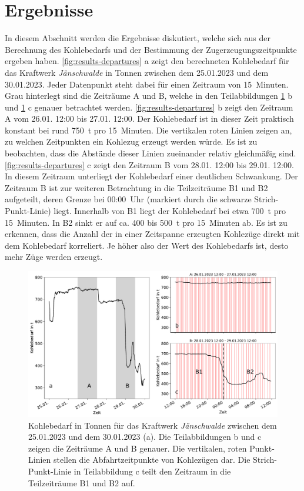 \section{Ergebnisse}

In diesem Abschnitt werden die Ergebnisse diskutiert, welche sich aus der Berechnung des Kohlebedarfs und der Bestimmung der Zugerzeugungszeitpunkte ergeben haben. \autoref{fig:results-departures} a zeigt den berechneten Kohlebedarf für das Kraftwerk \emph{Jänschwalde} in Tonnen zwischen dem 25.01.2023 und dem 30.01.2023. Jeder Datenpunkt steht dabei für einen Zeitraum von 15~Minuten. Grau hinterlegt sind die Zeiträume A und B, welche in den Teilabbildungen \ref{fig:results-departures} b und \ref{fig:results-departures} c genauer betrachtet werden. \autoref{fig:results-departures} b zeigt den Zeitraum A vom 26.01. 12:00 bis 27.01. 12:00. Der Kohlebedarf ist in dieser Zeit praktisch konstant bei rund 750~t pro 15~Minuten. Die vertikalen roten Linien zeigen an, zu welchen Zeitpunkten ein Kohlezug erzeugt werden würde. Es ist zu beobachten, dass die Abstände dieser Linien zueinander relativ gleichmäßig sind. \autoref{fig:results-departures} c zeigt den Zeitraum B vom 28.01. 12:00 bis 29.01. 12:00. In diesem Zeitraum unterliegt der Kohlebedarf einer deutlichen Schwankung. Der Zeitraum B ist zur weiteren Betrachtung in die Teilzeiträume B1 und B2 aufgeteilt, deren Grenze bei 00:00~Uhr (markiert durch die schwarze Strich-Punkt-Linie) liegt. Innerhalb von B1 liegt der Kohlebedarf bei etwa 700~t pro 15~Minuten. In B2 sinkt er auf ca. 400 bis 500~t pro 15~Minuten ab. Es ist zu erkennen, dass die Anzahl der in einer Zeitspanne erzeugten Kohlezüge direkt mit dem Kohlebedarf korreliert. Je höher also der Wert des Kohlebedarfs ist, desto mehr Züge werden erzeugt.

\begin{figure}[!ht]
	\centering
	\includegraphics[width=1.0\linewidth]{images/results/departures.pdf}
	\caption{Kohlebedarf in Tonnen für das Kraftwerk \emph{Jänschwalde} zwischen dem 25.01.2023 und dem 30.01.2023 (a). Die Teilabbildungen b und c zeigen die Zeiträume A und B genauer. Die vertikalen, roten Punkt-Linien stellen die Abfahrtzeitpunkte von Kohlezügen dar. Die Strich-Punkt-Linie in Teilabbildung c teilt den Zeitraum in die Teilzeiträume B1 und B2 auf.}
	\label{fig:results-departures}
\end{figure}

